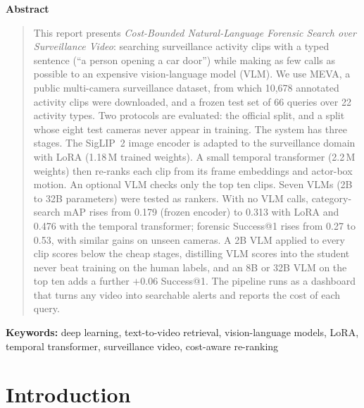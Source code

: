 \documentclass[11pt,a4paper]{article}
\newcommand{\ProjectTitle}{Cost-Bounded Natural-Language Forensic Search over Surveillance Video}
\begin{document}
\begin{center}\textbf{Abstract}\end{center}
\begin{quote}
This report presents \emph{\ProjectTitle}: searching surveillance activity clips with a typed sentence (``a
person opening a car door'') while making as few calls as possible to an expensive vision-language model (VLM).
We use MEVA, a public multi-camera surveillance dataset, from which 10,678 annotated activity clips were
downloaded, and a frozen test set of 66 queries over 22 activity types. Two protocols are evaluated: the official
split, and a split whose eight test cameras never appear in training. The system has three stages. The SigLIP~2
image encoder is adapted to the surveillance domain with LoRA (1.18\,M trained weights). A small temporal
transformer (2.2\,M weights) then re-ranks each clip from its frame embeddings and actor-box motion. An optional
VLM checks only the top ten clips. Seven VLMs (2B to 32B parameters) were tested as rankers. With no VLM calls,
category-search mAP rises from 0.179 (frozen encoder) to 0.313 with LoRA and 0.476 with the temporal
transformer; forensic Success@1 rises from 0.27 to 0.53, with similar gains on unseen cameras. A 2B VLM applied
to every clip scores below the cheap stages, distilling VLM scores into the student never beat training on the
human labels, and an 8B or 32B VLM on the top ten adds a further $+0.06$ Success@1. The pipeline runs as a
dashboard that turns any video into searchable alerts and reports the cost of each query.
\end{quote}

\vspace{0.5cm}
\noindent\textbf{Keywords:} deep learning, text-to-video retrieval, vision-language models, LoRA, temporal
transformer, surveillance video, cost-aware re-ranking

\clearpage
\tableofcontents
\clearpage
\listoffigures
\listoftables
\clearpage

\setcounter{page}{1}

\section{Introduction}
\end{document}

